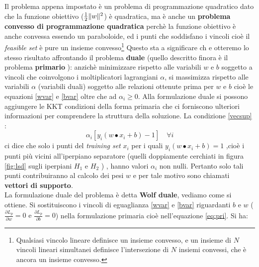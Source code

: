 Il problema appena impostato è un problema di programmazione quadratico dato che la funzione obiettivo ($\frac{1}{2}\lVert w\rVert^2$) è quadratica, ma è anche un \textbf{problema convesso di programmazione quadratica} perchè la funzione obiettivo è anche convessa essendo un paraboloide, ed i punti che soddisfano i vincoli cioè il \textit{feasible set} è pure un insieme convesso\footnote{Qualsiasi vincolo lineare definisce un insieme convesso, e un insieme di $N$ vincoli lineari simultanei definisce l'intersezione di $N$ insiemi convessi, che è ancora un insieme convesso.} Questo sta a significare ch e otteremo lo stesso risultato affrontando il problema \textbf{duale} (quello descritto finora è il problema \textbf{primario} ): anzichè minimizzare rispetto alle variabili $w \text{ e } b$ soggetto a vincoli che coinvolgono i moltiplicatori lagrangiani $\alpha$, si massimizza rispetto alle variabili $\alpha$ (variabili duali) soggetto alle relazioni ottenute prima per $w \text{ e } b$ cioè le equazioni \eqref{wvar} e \eqref{bvar} oltre che ad $\alpha_{i} \geq 0$. Alla formulazione duale si possono aggiungere le KKT condizioni della forma primaria che ci forniscono ulteriori informazioni per comprendere la struttura della soluzione. La condizione  \eqref{vecsup} :
\[
\alpha_{i}[y_{i}(w \bullet x_i + b) - 1] \quad \forall i
\]
ci dice che solo i punti del \textit{training set} $x_i$ per i quali $y_{i}(w \bullet x_i + b) = 1$ ,cioè i punti più vicini all'iperpiano separatore (quelli doppiamente cerchiati in figura \ref{fig:lsd} sugli iperpiani $H_{1}$ e $H_{2}$ ) , hanno valori $\alpha_{i}$ non nulli. Pertanto solo tali punti contribuiranno al calcolo dei pesi $w$ e per tale motivo sono chiamati \textbf{vettori di supporto}.\\
La formulazione duale del problema è detta \textbf{Wolf duale}, vediamo come si ottiene. Si sostituiscono i vincoli di eguaglianza \eqref{wvar} e \eqref{bvar} riguardanti $b$ e $w$ ($\frac{\partial L_{p}}{\partial w} = 0 \text{ e } \frac{\partial L_{p}}{\partial b} = 0$) nella formulazione primaria cioè nell'equazione \eqref{eq:pri}. Si ha:
